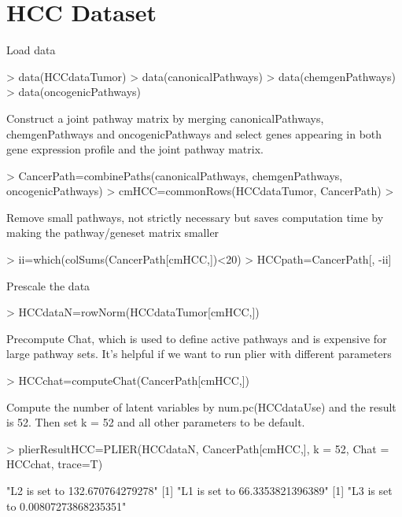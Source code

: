\documentclass{article}
\begin{document}
\section{HCC Dataset}
Load data
\begin{Schunk}
\begin{Sinput}
> data(HCCdataTumor)
> data(canonicalPathways)
> data(chemgenPathways)
> data(oncogenicPathways)
\end{Sinput}
\end{Schunk}
Construct a joint pathway matrix by merging canonicalPathways, chemgenPathways and oncogenicPathways and select genes appearing in both gene expression profile and the joint pathway matrix.
\begin{Schunk}
\begin{Sinput}
> CancerPath=combinePaths(canonicalPathways, chemgenPathways, oncogenicPathways)
> cmHCC=commonRows(HCCdataTumor, CancerPath)
> 
\end{Sinput}
\end{Schunk}
Remove small pathways, not strictly necessary but saves computation time by making the pathway/geneset matrix smaller
\begin{Schunk}
\begin{Sinput}
> ii=which(colSums(CancerPath[cmHCC,])<20)
> HCCpath=CancerPath[, -ii]
\end{Sinput}
\end{Schunk}
Prescale the data
\begin{Schunk}
\begin{Sinput}
> HCCdataN=rowNorm(HCCdataTumor[cmHCC,])
\end{Sinput}
\end{Schunk}
Precompute Chat, which is used to define active pathways and is expensive for large pathway sets. It's helpful if we want to run plier with different parameters
\begin{Schunk}
\begin{Sinput}
> HCCchat=computeChat(CancerPath[cmHCC,])
\end{Sinput}
\end{Schunk}
Compute the number of latent variables by num.pc(HCCdataUse) and the result is 52. Then set k = 52 and all other parameters to be default.
\begin{Schunk}
\begin{Sinput}
> plierResultHCC=PLIER(HCCdataN, CancerPath[cmHCC,], k = 52, Chat = HCCchat, trace=T)
\end{Sinput}
\begin{Soutput}
[1] "L2 is set to 132.670764279278"
[1] "L1 is set to 66.3353821396389"
[1] "L3 is set to 0.00807273868235351"
\end{Soutput}
\end{Schunk}
\end{document}
